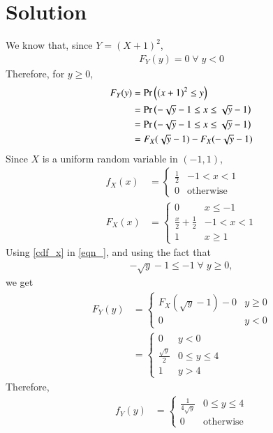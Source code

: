 \documentclass[journal,12pt,twocolumn]{IEEEtran}
\begin{document}
\section{Solution}
We know that, since $Y = (X+1)^2$, 
\begin{align}
F_Y(y) = 0 \; \forall \; y < 0
\end{align}
Therefore, for $y\geq 0$, 
\begin{align}
F_Y(y) &= \Pr\left((x+1)^2 \leq y\right) \\
&= \Pr\left(-\sqrt{y} - 1 \leq x \leq \sqrt{y} - 1 \right) \\
&= \Pr\left(-\sqrt{y} - 1 \leq x \leq \sqrt{y} - 1 \right) \\
&= F_X(\sqrt{y} - 1) - F_X(-\sqrt{y} - 1) 
\label{eqn_}
\end{align}
Since $X$ is a uniform random variable in $(-1, 1)$,
\begin{align}
f_X(x) &= 
\begin{cases}
\frac{1}{2} & -1 < x < 1 \\
0 & \text{otherwise}
\end{cases}\\
F_X(x) &= 
\begin{cases}
0 & x \leq -1 \\
\frac{x}{2} + \frac{1}{2} & -1 < x < 1 \\
1 & x \geq 1
\end{cases}
\label{cdf_x}
\end{align}
Using \eqref{cdf_x} in \eqref{eqn_}, and using the fact that 
\begin{align}
-\sqrt{y}-1 \leq -1 \; \forall \; y \geq 0,
\end{align}
we get
\begin{align}
F_Y(y) &=  \begin{cases}
F_X(\sqrt{y} - 1) - 0 & y \geq 0\\
0 & y < 0
\end{cases} \\
&= \begin{cases}
0 & y < 0 \\
\frac{\sqrt{y}}{2}  & 0 \leq y \leq 4\\
1 & y > 4
\end{cases}
\end{align}
Therefore, 
\begin{align}
f_Y(y) &= \begin{cases}
\frac{1}{4\sqrt{y}}  & 0 \leq y \leq 4\\
0 & \text{otherwise}
\end{cases}
\end{align}
\end{document}
